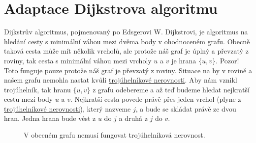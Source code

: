 \section{Adaptace Dijkstrova algoritmu}
\label{sec:dijkstra}

Dijkstrův algoritmus, pojmenovaný po Edsgerovi W. Dijkstrovi, je algoritmus na hledání cesty s minimální váhou mezi dvěma body v ohodnoceném grafu. Obecně taková cesta může mít několik vrcholů, ale protože náš graf je úplný a převzatý z roviny, tak cesta s minimální váhou mezi vrcholy $u$ a $v$ je hrana $\{u, v\}$. Pozor! Toto funguje pouze protože náš graf je převzatý z roviny. Situace na  by v rovině a našem grafu nemohla nastat kvůli \hyperref[definice:trojuhelnikova_nerovnost]{trojúhelníkové nerovnosti}. Aby nám vznikl trojúhelník, tak hranu $\{u, v\}$ z grafu odebereme a až teď budeme hledat nejkratší cestu mezi body $u$ a $v$. Nejkratší cesta povede právě přes jeden vrchol (plyne z \hyperref[definice:trojuhelnikova_nerovnost]{trojúhelníkové nerovnosti}), který nazveme $j$, a bude se skládat právě ze dvou hran. Jedna hrana bude vést z $u$ do $j$ a druhá z $j$ do $v$. 



\begin{figure}[h]

    \centering
    \caption{V obecném grafu nemusí fungovat trojúhelníková nerovnost.}
    \label{obr:troj_ner_graf}
\end{figure}





